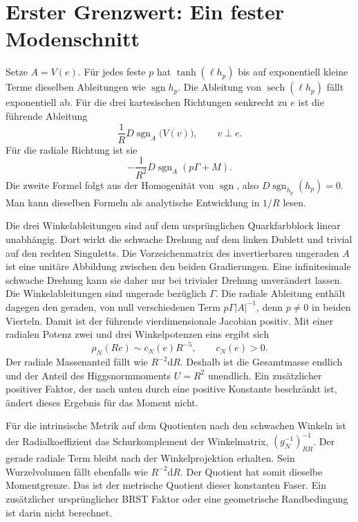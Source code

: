 \documentclass[11pt,a4paper]{article}
\newcommand{\sgn}{\operatorname{sgn}}
\newcommand{\dd}{\mathrm d}
\begin{document}
\section*{Erster Grenzwert: Ein fester Modenschnitt}
Setze $A=V(e)$. Für jedes feste $p$ hat $\tanh(\ell h_p)$ bis auf exponentiell kleine Terme dieselben Ableitungen wie $\sgn h_p$. Die Ableitung von $\operatorname{sech}(\ell h_p)$ fällt exponentiell ab. Für die drei kartesischen Richtungen senkrecht zu $e$ ist die führende Ableitung
\[
 \frac1R D\sgn_{A}\bigl(V(v)\bigr),\qquad v\perp e.
\]
Für die radiale Richtung ist sie
\[
 -\frac1{R^2}D\sgn_A(p\Gamma+M).
\]
Die zweite Formel folgt aus der Homogenität von $\sgn$, also $D\sgn_{h_p}(h_p)=0$. Man kann dieselben Formeln als analytische Entwicklung in $1/R$ lesen.

\clearpage
Die drei Winkelableitungen sind auf dem ursprünglichen Quarkfarbblock linear unabhängig. Dort wirkt die schwache Drehung auf dem linken Dublett und trivial auf den rechten Singuletts. Die Vorzeichenmatrix des invertierbaren ungeraden $A$ ist eine unitäre Abbildung zwischen den beiden Gradierungen. Eine infinitesimale schwache Drehung kann sie daher nur bei trivialer Drehung unverändert lassen. Die Winkelableitungen sind ungerade bezüglich $\Gamma$. Die radiale Ableitung enthält dagegen den geraden, von null verschiedenen Term $p\Gamma|A|^{-1}$, denn $p\ne0$ in beiden Vierteln. Damit ist der führende vierdimensionale Jacobian positiv. Mit einer radialen Potenz zwei und drei Winkelpotenzen eins ergibt sich
\[
 \rho_N(R e)\sim c_N(e)R^{-5},\qquad c_N(e)>0 .
\]
Der radiale Massenanteil fällt wie $R^{-2}\dd R$. Deshalb ist die Gesamtmasse endlich und der Anteil des Higgsnormmoments $U=R^2$ unendlich. Ein zusätzlicher positiver Faktor, der nach unten durch eine positive Konstante beschränkt ist, ändert dieses Ergebnis für das Moment nicht.

Für die intrinsische Metrik auf dem Quotienten nach den schwachen Winkeln ist der Radialkoeffizient das Schurkomplement der Winkelmatrix, $(g_N^{-1})_{RR}^{-1}$. Der gerade radiale Term bleibt nach der Winkelprojektion erhalten. Sein Wurzelvolumen fällt ebenfalls wie $R^{-2}\dd R$. Der Quotient hat somit dieselbe Momentgrenze. Das ist der metrische Quotient dieser konstanten Faser. Ein zusätzlicher ursprünglicher BRST Faktor oder eine geometrische Randbedingung ist darin nicht berechnet.
\end{document}
